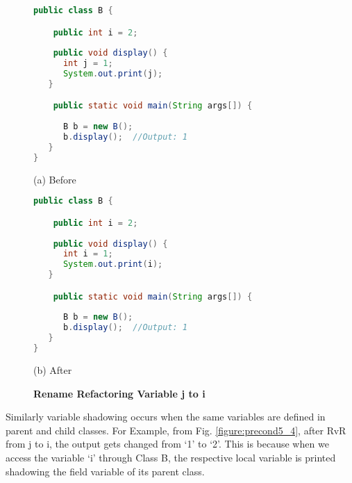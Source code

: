 \begin{figure}[th]
\centering
\begin{minipage}[t]{0.8\linewidth}
\begin{lstlisting}[language=java, basicstyle=\scriptsize\ttfamily,frame=single]
public class B {

    public int i = 2;
    
    public void display() {
      int j = 1;
      System.out.print(j); 		
   }

    public static void main(String args[]) {
    
      B b = new B();
      b.display();  //Output: 1
   }
}
\end{lstlisting}
\centering(a) Before 
\end{minipage}
\hfill
\begin{minipage}[t]{0.8\linewidth}
\begin{lstlisting}[language=java, basicstyle=\scriptsize\ttfamily,frame=single]
public class B {

    public int i = 2;
    
    public void display() {
      int i = 1;
      System.out.print(i); 		
   }

    public static void main(String args[]) {
    
      B b = new B();
      b.display();  //Output: 1
   }
}
\end{lstlisting}
\centering(b) After 
\end{minipage}
\caption{\textbf{Rename Refactoring Variable j to i }}
\label{figure:precond5_3}
\end{figure}



Similarly variable shadowing occurs when the same variables are defined in parent and child classes.
For Example, from Fig. \ref{figure:precond5_4}, after RvR from j to i, the output gets changed from `1' to `2'. This is because when we access the variable `i' through Class B, the respective local variable is printed shadowing the field variable of its parent class.

